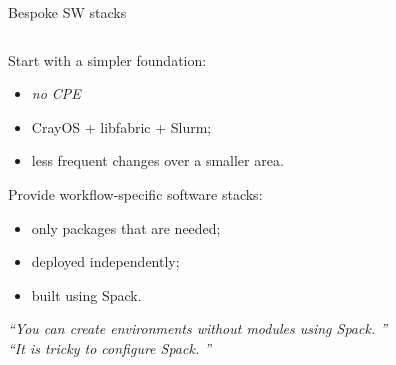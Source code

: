 \documentclass[aspectratio=43]{beamer}
\begin{document}

\begin{frame}[fragile]{Bespoke SW stacks}
    \begin{columns}[T]
        \begin{column}{0.6\textwidth}
            Start with a simpler foundation:
            \begin{itemize}
                \item \emph{no CPE}
                \item CrayOS + libfabric + Slurm;
                \item less frequent changes over a smaller area.
            \end{itemize}

            Provide workflow-specific software stacks:
            \begin{itemize}
                \item only packages that are needed;
                \item deployed independently;
                \item built using Spack.
            \end{itemize}

            \begin{center}
            \emph{``You can create environments without modules using Spack. ''}\\
            \emph{``It is tricky to configure Spack. ''}
            \end{center}



\end{column}
\end{columns}
\end{frame}
\end{document}
